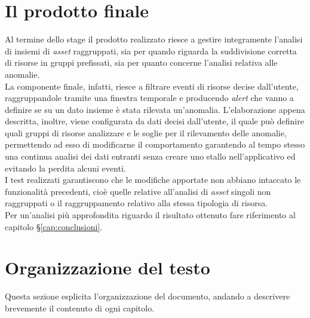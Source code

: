 \section{Il prodotto finale}
Al termine dello stage il prodotto realizzato riesce a gestire integramente l'analisi di insiemi di \textit{asset} raggruppati, sia per quando riguarda la suddivisione corretta di risorse in gruppi prefissati, sia per quanto concerne l'analisi relativa alle anomalie.\\
La componente finale, infatti, riesce a filtrare eventi di risorse decise dall'utente, raggruppandole tramite una finestra temporale e producendo \textit{alert} che vanno a definire se su un dato insieme è stata rilevata un'anomalia. L'elaborazione appena descritta, inoltre, viene configurata da dati decisi dall'utente, il quale può definire quali gruppi di risorse analizzare e le soglie per il rilevamento delle anomalie, permettendo ad esso di modificarne il comportamento garantendo al tempo stesso una continua analisi dei dati entranti senza creare uno stallo nell'applicativo ed evitando la perdita alcuni eventi.\\
I test realizzati garantiscono che le modifiche apportate non abbiano intaccato le funzionalità precedenti, cioè quelle relative all'analisi di \textit{asset} singoli non raggruppati o il raggruppamento relativo alla stessa tipologia di risorsa.\\
Per un'analisi più approfondita riguardo il risultato ottenuto fare riferimento al capitolo \S\ref{cap:conclusioni}.




\section{Organizzazione del testo}
Questa sezione esplicita l'organizzazione del documento, andando a descrivere brevemente il contenuto di ogni capitolo.

